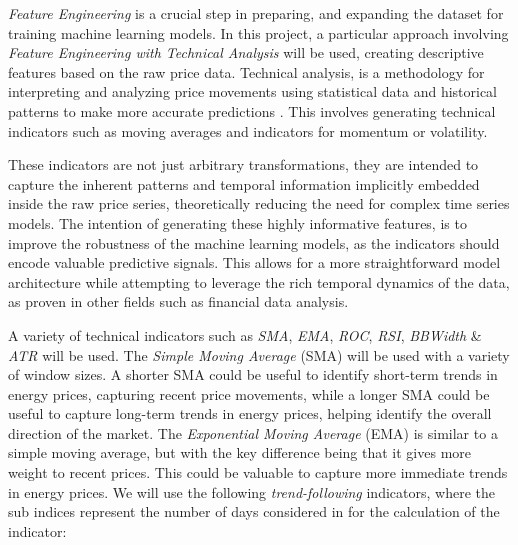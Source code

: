 \documentclass[12pt]{report} %
\begin{document}


\textit{Feature Engineering} is a crucial step in preparing, and expanding the dataset for training machine learning models. In this project, a particular approach involving \textit{Feature Engineering with Technical Analysis} will be used, creating descriptive features based on the raw price data. Technical analysis, is a methodology for interpreting and analyzing price movements using statistical data and historical patterns to make more accurate predictions \cite{ta-academic}. This involves generating technical indicators such as moving averages and indicators for momentum or volatility.


These indicators are not just arbitrary transformations, they are intended to capture the inherent patterns and temporal information implicitly embedded inside the raw price series, theoretically reducing the need for complex time series models. The intention of generating these highly informative features, is to improve the robustness of the machine learning models, as the indicators should encode valuable predictive signals. This allows for a more straightforward model architecture while attempting to leverage the rich temporal dynamics of the data, as proven in other fields such as financial data analysis.

A variety of technical indicators such as \textit{SMA}, \textit{EMA}, \textit{ROC}, \textit{RSI}, \textit{BBWidth} \& \textit{ATR} will be used. The \textit{Simple Moving Average} (SMA) will be used with a variety of window sizes. A shorter SMA could be useful to identify short-term trends in energy prices, capturing recent price movements, while a longer SMA could be useful to capture long-term trends in energy prices, helping identify the overall direction of the market. The \textit{Exponential Moving Average} (EMA) is similar to a simple moving average, but with the key difference being that it gives more weight to recent prices. This could be valuable to capture more immediate trends in energy prices. We will use the following \textit{trend-following} indicators, where the sub indices represent the number of days considered in for the calculation of the indicator:
\end{document}

